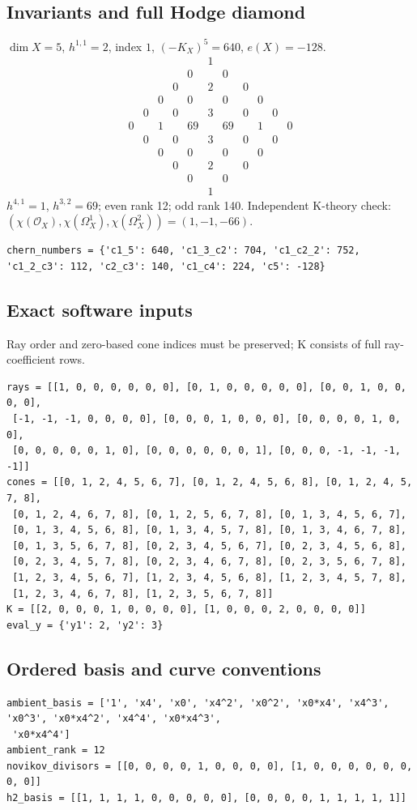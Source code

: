 \documentclass[10pt,a4paper]{article}
\begin{document}
\subsection*{Invariants and full Hodge diamond}
$\dim X=5$, $h^{1,1}=2$, index $1$, $(-K_X)^5=640$, $e(X)=-128$.
\[\begin{array}{ccccccccccc}&&&&&1&&&&&\\&&&&0&&0&&&&\\&&&0&&2&&0&&&\\&&0&&0&&0&&0&&\\&0&&0&&3&&0&&0&\\0&&1&&69&&69&&1&&0\\&0&&0&&3&&0&&0&\\&&0&&0&&0&&0&&\\&&&0&&2&&0&&&\\&&&&0&&0&&&&\\&&&&&1&&&&&\end{array}\]
$h^{4,1}=1$, $h^{3,2}=69$; even rank 12; odd rank 140.
Independent K-theory check: $(\chi(\mathcal O_X),\chi(\Omega_X^1),\chi(\Omega_X^2))=(1, -1, -66)$.
\begin{lstlisting}
chern_numbers = {'c1_5': 640, 'c1_3_c2': 704, 'c1_c2_2': 752, 'c1_2_c3': 112, 'c2_c3': 140, 'c1_c4': 224, 'c5': -128}
\end{lstlisting}
\subsection*{Exact software inputs}
Ray order and zero-based cone indices must be preserved; K consists of full ray-coefficient rows.
\begin{lstlisting}
rays = [[1, 0, 0, 0, 0, 0, 0], [0, 1, 0, 0, 0, 0, 0], [0, 0, 1, 0, 0, 0, 0],
 [-1, -1, -1, 0, 0, 0, 0], [0, 0, 0, 1, 0, 0, 0], [0, 0, 0, 0, 1, 0, 0],
 [0, 0, 0, 0, 0, 1, 0], [0, 0, 0, 0, 0, 0, 1], [0, 0, 0, -1, -1, -1, -1]]
cones = [[0, 1, 2, 4, 5, 6, 7], [0, 1, 2, 4, 5, 6, 8], [0, 1, 2, 4, 5, 7, 8],
 [0, 1, 2, 4, 6, 7, 8], [0, 1, 2, 5, 6, 7, 8], [0, 1, 3, 4, 5, 6, 7],
 [0, 1, 3, 4, 5, 6, 8], [0, 1, 3, 4, 5, 7, 8], [0, 1, 3, 4, 6, 7, 8],
 [0, 1, 3, 5, 6, 7, 8], [0, 2, 3, 4, 5, 6, 7], [0, 2, 3, 4, 5, 6, 8],
 [0, 2, 3, 4, 5, 7, 8], [0, 2, 3, 4, 6, 7, 8], [0, 2, 3, 5, 6, 7, 8],
 [1, 2, 3, 4, 5, 6, 7], [1, 2, 3, 4, 5, 6, 8], [1, 2, 3, 4, 5, 7, 8],
 [1, 2, 3, 4, 6, 7, 8], [1, 2, 3, 5, 6, 7, 8]]
K = [[2, 0, 0, 0, 1, 0, 0, 0, 0], [1, 0, 0, 0, 2, 0, 0, 0, 0]]
eval_y = {'y1': 2, 'y2': 3}
\end{lstlisting}
\subsection*{Ordered basis and curve conventions}
\begin{lstlisting}
ambient_basis = ['1', 'x4', 'x0', 'x4^2', 'x0^2', 'x0*x4', 'x4^3', 'x0^3', 'x0*x4^2', 'x4^4', 'x0*x4^3',
 'x0*x4^4']
ambient_rank = 12
novikov_divisors = [[0, 0, 0, 0, 1, 0, 0, 0, 0], [1, 0, 0, 0, 0, 0, 0, 0, 0]]
h2_basis = [[1, 1, 1, 1, 0, 0, 0, 0, 0], [0, 0, 0, 0, 1, 1, 1, 1, 1]]
\end{lstlisting}
\end{document}
